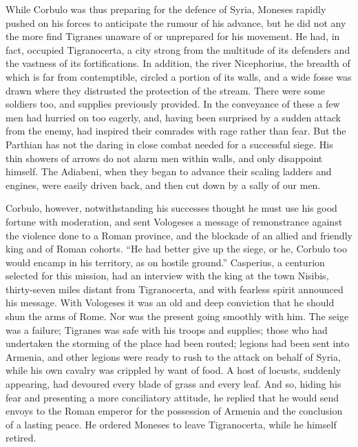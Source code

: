 While Corbulo was thus preparing for the defence of Syria, Moneses rapidly pushed on his forces to anticipate the rumour of his advance, but he did not any the more find Tigranes unaware of or unprepared for his movement. He had, in fact, occupied Tigranocerta, a city strong from the multitude of its defenders and the vastness of its fortifications. In addition, the river Nicephorius, the breadth of which is far from contemptible, circled a portion of its walls, and a wide fosse was drawn where they distrusted the protection of the stream. There were some soldiers too, and supplies previously provided. In the conveyance of these a few men had hurried on too eagerly, and, having been surprised by a sudden attack from the enemy, had inspired their comrades with rage rather than fear. But the Parthian has not the daring in close combat needed for a successful siege. His thin showers of arrows do not alarm men within walls, and only disappoint himself. The Adiabeni, when they began to advance their scaling ladders and engines, were easily driven back, and then cut down by a sally of our men.


Corbulo, however, notwithstanding his successes thought he must use his good fortune with moderation, and sent Vologeses a message of remonstrance against the violence done to a Roman province, and the blockade of an allied and friendly king and of Roman cohorts. ``He had better give up the siege, or he, Corbulo too would encamp in his territory, as on hostile ground.'' Casperius, a centurion selected for this mission, had an interview with the king at the town Nisibis, thirty-seven miles distant from Tigranocerta, and with fearless spirit announced his message. With Vologeses it was an old and deep conviction that he should shun the arms of Rome. Nor was the present going smoothly with him. The seige was a failure; Tigranes was safe with his troops and supplies; those who had undertaken the storming of the place had been routed; legions had been sent into Armenia, and other legions were ready to rush to the attack on behalf of Syria, while his own cavalry was crippled by want of food. A host of locusts, suddenly appearing, had devoured every blade of grass and every leaf. And so, hiding his fear and presenting a more conciliatory attitude, he replied that he would send envoys to the Roman emperor for the possession of Armenia and the conclusion of a lasting peace. He ordered Moneses to leave Tigranocerta, while he himself retired.


